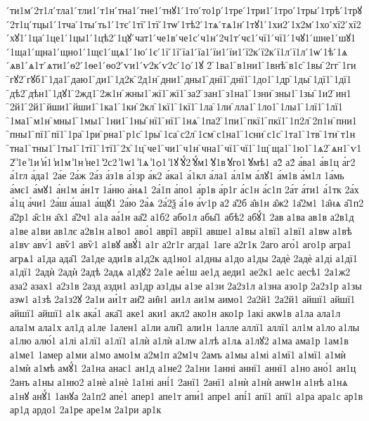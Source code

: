 {́ти1м
́2т1л
́тла1
́тли1
́т1н
́тна1
́тне1
́тнꙋ1
́1то
́то1р
́1тре
́1три1
́1тро
́1тры
́1трѣ
́1трꙋ
́2т1ц
́тцы1
́1тча
́1ты
́ть1
́1тє
́1тї
́1тї
́1тѡ
́1тѣ2
́1тѧ
́тѧ1н
́1тꙋ1
́1хи2
́1х2м
́1хо
́хї2
́хї2
́хꙋ1
́1ца
́1це1
́1цы1
́1цѣ2
́1цꙋ
́чат1
́че1в
́че1с
́ч1н
́2ч1т
́чє1
́чї1
́чї1
́1чꙋ1
́шне1
́шꙋ1
́1ща1
́щна1
́щно1
́1щє1
́щѧ1
́1ю
́1є
́1ї
́1ї
́їа1
́їа1
́їи1
́їи1
́ї2к
́ї2к
́ї1л
́ї1л
́1ѡ
́1ѣ
́1ѧ
́ѧв1
́ѧ1т
́ѧти1
́ѳ2
́1ѳе1
́ѳо2
́ѵи1
́ѵ2к
́ѵ2с
́1ѻ
́1ꙋ
2̑
̑1ва1
̑в1ни1
̑1внѣ
̑в1с
̑1вы
̑2гг
̑1ги
̑гꙋ2
̑гꙋб1
̑1да1
̑даю1
̑ди1
̑1д2к
̑2д1н
̑дни1
̑дны1
̑днї1
̑днї1
̑1до1
̑1др
̑1ды
̑1дї1
̑1дї1
̑дѣ2
̑дѣн1
̑1дꙋ1
̑2жд1
̑2ж1н
̑жны1
̑жї1
̑жї1
̑за2
̑зан1
̑з1на1
̑1зни
̑зны1
̑1зы
̑1и2
̑ин1
̑2й1
̑2й1
̑йши1
̑йши1
̑1ка1
̑1ки
̑2кл
̑1кї1
̑1кї1
̑1ла
̑1ли
̑лла1
̑1ло1
̑1лы1
̑1лї1
̑1лї1
̑1ма1
̑м1н
̑мны1
̑1мы1
̑1ни1
̑1ны
̑нї1
̑нї1
̑1нѧ
̑1па2
̑1пи1
̑пкї1
̑пкї1
̑1п2л
̑2п1н
̑пни1
̑пны1
̑пї1
̑пї1
̑1ра
̑1ри
̑рна1
̑р1с
̑1ры
̑1са
̑с2л
̑1см
̑с1на1
̑1сни
̑с1с
̑1та1
̑1тв
̑1ти
̑т1н
̑тна1
̑тны1
̑1ты1
̑1тї1
̑1тї1
̑2х
̑1ц
̑че1
̑чи1
̑ч1н
̑чна1
̑чї1
̑чї1
̑1щ
̑ща1
̑1ю1
̑1ѧ2
̑ѧн1
̑ѵ1
2̾
̾1е
̾1и
̾и́1
̾и1м
̾1н
̾не1
̾2с2
̾1ѡ1
̾1ѧ
̾1ѻ1
̾1ꙋ
̾ꙋ́2
̾ꙋ́м1
̾ꙋ1в
̾ꙋго1
̾ꙋмѣ1
а2̀
а2́
а́ва1
а́в1ц
а́г2
а́1гл
а́да1
2а́е
2а́ж
2а́з
а́з1в
а́1зр
а́к2
а́ка1
а́1кл
а́ла1
а́л1м
а́лꙋ1
а́м1в
а́м1л
1а́мь
а́мє1
а́мꙋ1
а́н1м
а́н1т
1а́ню
а́нѧ1
2а́1п
а́по1
а́р1в
а́р1г
а́с1н
а́с1п
2а́т
а́ти1
а́1тк
2а́х
а́1ц
а́чи1
2а́ш
а́ша1
а́щꙋ1
2а́ю
2а́ѧ
2а́2ѯ
а́1ѳ
а́ѵ1р
а2̑
а̑2б
а̑в1н
а̑ж2
1а̑2м1
1а̑нѧ
а̑1п2
а̑2р1
а̑с1н
а̑х1
а̑2ч1
а1а
аа́1н
аа̑2
а1б2
або1л
абы̑1
абѣ2
абꙋ́1
2ав
а1ва
ав1в
а2в1д
а1ве
а1ви
ав1лє
а2в1н
а1во1
аво́1
аврї1
аврї1
авше1
а1вы
а1вї1
а1вї1
а1вѡ
а1вѣ
а1вѵ
авѵ́1
авѷ1
авѷ1
а1вꙋ
авꙋ́1
а1г
а2г1г
агда1
1аге
а2г1к
2аго
аго́1
аго1р
агра1
агрѧ1
а1да
ада̑1
2а1де
ади1в
а1д2к
ад1но1
а1дны
а1до
а1ды
2адѐ
2адѐ
а1ді
а1дї1
а1дї1
2адѝ
2адѝ
2адѣ
2адѧ
а1дꙋ2
2а1е
ае́1ш
ае1д
аеди1
ае2к1
ае1с
аесѣ1
2а1ж2
аза2
азах1
а2з1в
2азд
азди1
аз1др
аз1ды
а1зе
а1зи
2а2з1л
а1зна
азо1р
2а2з1р
а1зы
азѡ1
а1зѣ
2а1з2ꙋ
2а1и
аи́1т
аи̑2
аи̑н1
аи1л
аи1м
аимо1
2а2й1
2а2й1
айшї1
айшї1
айшї1
айшї1
а1к
ака́1
ака̑1
аке1
аки1
акл2
ако1н
ако1р
1акі
акѡ1в
а1ла
ала1л
ала1м
ала1х
ал1д
а1ле
1ален1
а1ли
али̑1
али1н
1алле
аллї1
аллї1
ал1м
а1ло
а1лы
а1лю
алю́1
а1лі
а1лї1
а1лї1
а1лѝ
а1лѝ
а1лѡ
а1лѣ
а1лѧ
а1лꙋ2
а1ма
ама1р
1ам1в
а1ме1
1амер
а1ми
а1мо
амо1м
а2м1п
а2м1ч
2амъ
а1мы
а1мі
а1мї1
а1мї1
а1мѝ
а1мѝ
а1мѣ
амꙋ́1
2а1на
анас1
ан1д
а1не2
2а1ни
1анні
аннї1
аннї1
а1но
ано́1
ан1ц
2анъ
а1ны
а1ню2
а1нѐ
а1нѐ
1а1ні
ані́1
2анї1
2анї1
а1нѝ
а1нѝ
анѡ1н
а1нѣ
а1нѧ
а1нꙋ
анꙋ́1
1анꙋа
2а1п2
апе́1
апер1
апе1т
апи́1
апре1
апі́1
апї1
апї1
а1ра
ара1с
ар1в
ар1д
ардо1
2а1ре
аре1м
2а1ри
ар1к
}
